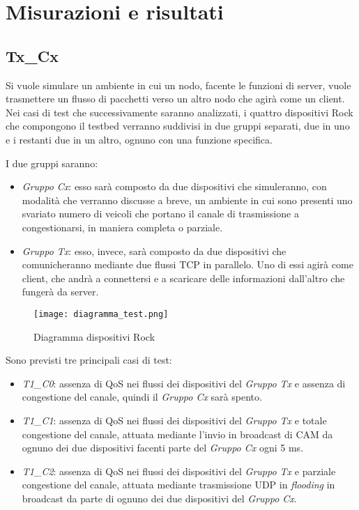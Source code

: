 \chapter{Misurazioni e risultati}

\section{Tx\_Cx}
Si vuole simulare un ambiente in cui un nodo, facente le funzioni di server, vuole trasmettere un flusso di pacchetti verso un altro nodo che agirà come un client. 
Nei casi di test che successivamente saranno analizzati, i quattro dispositivi Rock che compongono il testbed verranno suddivisi in due gruppi separati, due in uno e i restanti due in un altro, ognuno con una funzione specifica.

I due gruppi saranno:

\begin{itemize}
    \item \textit{Gruppo Cx}: esso sarà composto da due dispositivi che simuleranno, con modalità che verranno discusse a breve, un ambiente in cui sono presenti uno svariato numero di veicoli che portano il canale di trasmissione a congestionarsi, in maniera completa o parziale.
    \item \textit{Gruppo Tx}: esso, invece, sarà composto da due dispositivi che comunicheranno mediante due flussi TCP in parallelo. Uno di essi agirà come client, che andrà a connettersi e a scaricare delle informazioni dall'altro che fungerà da server.
\end{itemize}

\begin{figure}[h!]
    \centering
    \texttt{[image: diagramma\_test.png]}
    \caption{Diagramma dispositivi Rock}
    \label{fig:diagramma}
\end{figure}

Sono previsti tre principali casi di test:

\begin{itemize}
    \item \textit{T1\_C0}: assenza di QoS nei flussi dei dispositivi del \textit{Gruppo Tx} e assenza di congestione del canale, quindi il \textit{Gruppo Cx} sarà spento.
    \item \textit{T1\_C1}: assenza di QoS nei flussi dei dispositivi del \textit{Gruppo Tx} e totale congestione del canale, attuata mediante l'invio in broadcast di CAM da ognuno dei due dispositivi facenti parte del \textit{Gruppo Cx} ogni 5 ms.
    \item \textit{T1\_C2}: assenza di QoS nei flussi dei dispositivi del \textit{Gruppo Tx} e parziale congestione del canale, attuata mediante trasmissione UDP in \textit{flooding} in broadcast da parte di ognuno dei due dispositivi del \textit{Gruppo Cx}.
\end{itemize}

